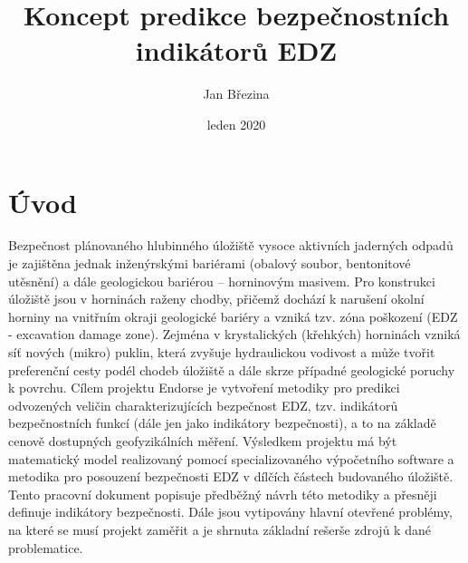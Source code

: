 \documentclass{article}
\title{Koncept predikce bezpečnostních indikátorů EDZ}
\author{Jan Březina}
\date{leden 2020}
\begin{document}
\maketitle


\section{Úvod}
Bezpečnost plánovaného hlubinného úložiště vysoce aktivních jaderných odpadů je zajištěna 
jednak inženýrskými bariérami (obalový soubor, bentonitové utěsnění) a dále geologickou bariérou 
– horninovým masivem. Pro konstrukci úložiště jsou v horninách raženy chodby, přičemž dochází 
k narušení okolní horniny na vnitřním okraji geologické bariéry a vzniká tzv. zóna poškození 
(EDZ - excavation damage zone). 
Zejména v krystalických (křehkých) horninách vzniká síť nových (mikro) puklin, která zvyšuje 
hydraulickou vodivost a může tvořit preferenční cesty podél 
chodeb úložiště a dále skrze případné geologické poruchy k povrchu.
Cílem projektu Endorse je vytvoření metodiky pro predikci odvozených veličin charakterizujících 
bezpečnost EDZ, tzv. indikátorů bezpečnostních funkcí (dále jen jako indikátory bezpečnosti), 
a to na základě cenově dostupných geofyzikálních měření. Výsledkem projektu má být matematický 
model realizovaný pomocí specializovaného výpočetního software a metodika pro posouzení 
bezpečnosti EDZ v dílčích částech budovaného úložiště.
Tento pracovní dokument popisuje předběžný návrh této metodiky a přesněji definuje indikátory 
bezpečnosti. Dále jsou vytipovány hlavní otevřené problémy, na které se musí projekt zaměřit a je 
shrnuta základní rešerše zdrojů k dané problematice. 
\end{document}

